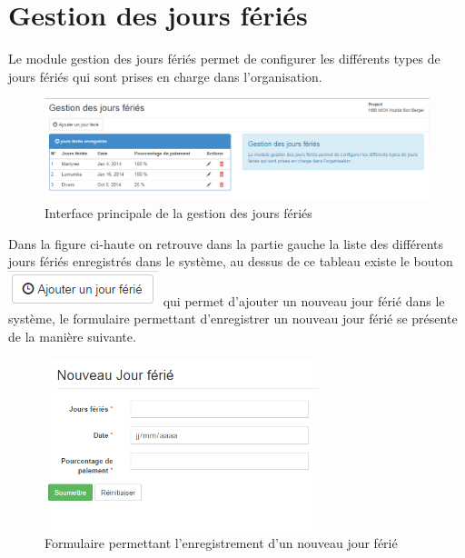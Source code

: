 \documentclass[12pt,a4paper]{report}
\begin{document}
\newpage
\section{Gestion des jours fériés}
Le module gestion des jours fériés permet de configurer les différents types de jours fériés qui sont prises en charge dans l'organisation.

\begin{figure}[h]
\begin{center}
\includegraphics[width=14cm]{pic/GestJourFerie.png}
\end{center}
\caption{Interface principale de la gestion des jours fériés}
\label{Interface principale de la gestion des jours fériés}
\end{figure}

Dans la figure ci-haute on retrouve dans la partie gauche la liste des différents jours fériés enregistrés dans le système, au dessus de ce tableau existe le bouton \includegraphics[scale=1]{pic/AddOffDays.png} qui permet d'ajouter un nouveau jour férié dans le système, le formulaire permettant d'enregistrer un nouveau jour férié se présente de la manière suivante.

\begin{figure}[h]
\begin{center}
\includegraphics[width=8cm]{pic/FormNewOffDays.png}
\end{center}
\caption{Formulaire permettant l'enregistrement d'un nouveau jour férié}
\label{Formulaire permettant l'enregistrement d'un nouveau jour férié}
\end{figure} 
\end{document}
